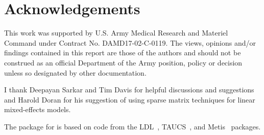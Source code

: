 \documentclass[12pt]{article}
\begin{document}
\section{Acknowledgements}
\label{sec:Ack}

This work was supported by U.S.{} Army Medical Research and Materiel
Command under Contract No.{} DAMD17-02-C-0119.  The views, opinions
and/or findings contained in this report are those of the authors and
should not be construed as an official Department of the Army
position, policy or decision unless so designated by other
documentation.

I thank Deepayan Sarkar and Tim Davis for helpful discussions and
suggestions and Harold Doran for his suggestion of using sparse
matrix techniques for linear mixed-effects models.

The  package for \RR{} is based on code from the
LDL~\citep{Davis:2004}, TAUCS~\citep{Taucs}, and Metis~\citep{Metis}
packages.


\end{document}
